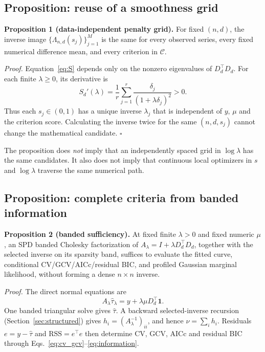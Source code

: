 \subsection{Proposition: reuse of a smoothness grid}
\noindent\textbf{Proposition 1 (data-independent penalty grid).}
For fixed $(n,d)$, the inverse image
$\{\Lambda_{n,d}(s_j)\}_{j=1}^M$ is the same for every
observed series, every fixed numerical difference mean,
and every criterion in $\mathcal C$.

\noindent\emph{Proof.}
Equation~\eqref{eq:S} depends only on the nonzero
eigenvalues of $D_d^\top D_d$. For each finite
$\lambda\ge0$, its derivative is
\[
S_d'(\lambda)=\frac1r\sum_{j=1}^r
\frac{\delta_j}{(1+\lambda\delta_j)^2}>0.
\]
Thus each $s_j\in(0,1)$ has a unique inverse
$\lambda_j$ that is independent of $y$, $\mu$ and
the criterion score. Calculating the inverse twice
for the same $(n,d,s_j)$ cannot change the
mathematical candidate. \hfill$\square$

The proposition does \emph{not} imply that an independently
spaced grid in $\log\lambda$ has the same candidates.
It also does not imply that continuous local optimizers
in $s$ and $\log\lambda$ traverse the same numerical path.

\subsection{Proposition: complete criteria from banded information}
\noindent\textbf{Proposition 2 (banded sufficiency).}
At fixed finite $\lambda>0$ and fixed numeric $\mu$,
an SPD banded Cholesky factorization of
$A_\lambda=I+\lambda D_d^\top D_d$, together with
the selected inverse on its sparsity band, suffices
to evaluate the fitted curve, conditional CV/GCV/AICc/residual BIC, and
profiled Gaussian marginal likelihood,
without forming a dense $n\times n$ inverse.

\noindent\emph{Proof.}
The direct normal equations are
\begin{equation}\label{eq:theory_rhs}
A_\lambda\widehat\tau_\lambda
=y+\lambda\mu D_d^\top\mathbf1.
\end{equation}
One banded triangular solve gives $\widehat\tau$.
A backward selected-inverse recursion
(Section~\ref{sec:structured}) gives
$h_i=(A_\lambda^{-1})_{ii}$, and hence
$\nu=\sum_i h_i$. Residuals $e=y-\widehat\tau$
and $\mathrm{RSS}=e^\top e$ then determine
CV, GCV, AICc and residual BIC through
Eqs.~\eqref{eq:cv_gcv}--\eqref{eq:information}.

